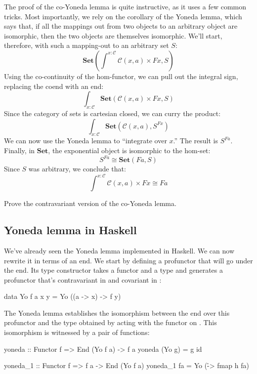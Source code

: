 \documentclass[DaoFP]{subfiles}
\begin{document}
The proof of the co-Yoneda lemma is quite instructive, as it uses a few common tricks. Most importantly, we rely on the corollary of the Yoneda lemma, which says that, if all the mappings out from two objects to an arbitrary object are isomorphic, then the two objects are themselves isomorphic. We'll start, therefore, with such a mapping-out to an arbitrary set $S$:
\[ \mathbf{Set} \left(\int^{x \colon \mathcal{C}} \mathcal{C}(x, a) \times F x, S \right) \]
Using the co-continuity of the hom-functor, we can pull out the integral sign, replacing the coend with an end:
\[ \int_{x \colon \mathcal{C}} \mathbf{Set} \left( \mathcal{C}(x, a) \times F x, S \right) \]
Since the category of sets is cartesian closed, we can curry the product:
\[ \int_{x \colon \mathcal{C}} \mathbf{Set} \left( \mathcal{C}(x, a) , S^{F x} \right) \]
We can now use the Yoneda lemma to ``integrate over $x$.'' The result is $S^{F a}$. Finally, in $\mathbf{Set}$, the exponential object is isomorphic to the hom-set:
\[S^{F a} \cong \mathbf{Set}(F a, S)\]
Since $S$ was arbitrary, we conclude that:
\[ \int^{x \colon \mathcal{C}} \mathcal{C}(x, a) \times F x \cong F a \]

\begin{exercise}
Prove the contravariant version of the co-Yoneda lemma.
\end{exercise}

\subsection{Yoneda lemma in Haskell}

We've already seen the Yoneda lemma implemented in Haskell. We can now rewrite it in terms of an end. We start by defining a profunctor that will go under the end. Its type constructor takes a functor  and a type  and generates a profunctor that's contravariant in  and covariant in :
\begin{haskell}
data Yo f a x y = Yo ((a -> x) -> f y)
\end{haskell}
The Yoneda lemma establishes the isomorphism between the end over this profunctor and the type obtained by acting with the functor   on . This isomorphism is witnessed by a pair of functions:
\begin{haskell}
yoneda :: Functor f => End (Yo f a) -> f a
yoneda (Yo g) = g id

yoneda_1 :: Functor f => f a -> End (Yo f a)
yoneda_1 fa = Yo (\h -> fmap h fa)
\end{haskell}
\end{document}
